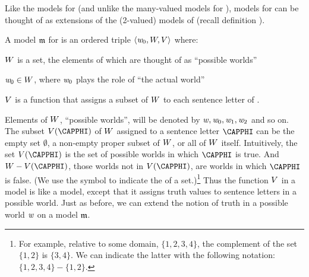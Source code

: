 Like the models for \GQL{} (and unlike the many-valued models for \GSL{}), models for \MGSL{} can be thought of as extensions of the (2-valued) models of \GSL{} (recall definition ).
\begin{majorILnc}{}
A model $\mathfrak{m}$ for \MGSL{} is an ordered triple $\langle\mathit{w}_0,W,V\rangle$ where:
\begin{cenumerate}
\item $W$ is a set, the elements of which are thought of as ``possible worlds''
\item $\mathit{w}_0\in W$, where $\mathit{w}_0$ plays the role of ``the actual world''
\item $V$ is a function that assigns a subset of $W$ to each sentence letter of \MGSL{}.
\end{cenumerate}
\end{majorILnc}
\noindent{}Elements of $W$, ``possible worlds'', will be denoted by $\mathit{w},\mathit{w}_0,\mathit{w}_1,\mathit{w}_2$ and so on. 
The subset $\integer{V}(\CAPPHI)$ of $W$ assigned to a sentence letter $\CAPPHI$ can be the empty set $\emptyset$, a non-empty proper subset of $W$, or all of $W$ itself. 
Intuitively, the set $\integer{V}(\CAPPHI)$ is the set of possible worlds in which $\CAPPHI$ is true.  And $\integer{W}-\integer{V}(\CAPPHI)$, those worlds not in $\integer{V}(\CAPPHI)$, are worlds in which $\CAPPHI$ is false.  (We use the \mention{$-$} symbol to indicate the  of a set.)\footnote{For example, relative to some domain, $\{ 1, 2, 3, 4\}$, the complement of the set $\{1, 2\}$ is $\{3, 4\}$.  We can indicate the latter with the following notation: $\{ 1, 2, 3, 4\}-\{1, 2\}$.}
Thus the function $V$ in a \MGSL{} model is like a \GSL{} model, except that it assigns truth values to sentence letters in a possible world. 
Just as before, we can extend the notion of truth in a possible world $\mathit{w}$ on a model $\mathfrak{m}$.
